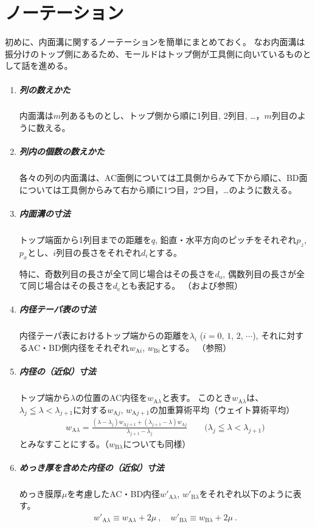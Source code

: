 \section{ノーテーション}
初めに、内面溝に関するノーテーションを簡単にまとめておく。
なお内面溝は振分けのトップ側にあるため、モールドはトップ側が工具側に向いているものとして話を進める。
\begin{tcolorbox}[title={内面溝に関するノーテーション}, fonttitle=\gtfamily\bfseries, breakable, enhanced jigsaw]
\begin{enumerate}
\item
\subparagraph{列の数えかた}
内面溝は$m$列あるものとし、トップ側から順に1列目, 2列目, …，$m$列目のように数える。

\item
\subparagraph{列内の個数の数えかた}
各々の列の内面溝は、AC面側については工具側からみて下から順に、BD面については工具側からみて右から順に1つ目，2つ目，…のように数える。

\item
\subparagraph{内面溝の寸法}
トップ端面から1列目までの距離を$q$, 鉛直・水平方向のピッチをそれぞれ$p_z$, $p_x$とし、$i$列目の長さをそれぞれ$d_i$とする。

特に、奇数列目の長さが全て同じ場合はその長さを$d_\mathrm o$, 偶数列目の長さが全て同じ場合はその長さを$d_\mathrm e$とも表記する。
（および参照）

\item
\subparagraph{内径テーパ表の寸法}
内径テーパ表におけるトップ端からの距離を$\lambda_i$ ($i = 0$, $1$, $2$, $\cdots$), それに対するAC・BD側内径をそれぞれ$w_{\mathrm Ai}$, $w_{\mathrm Bi}$とする。
（参照）

\item
\subparagraph{内径の（近似）寸法}
トップ端から$\lambda$の位置のAC内径を$w_{\mathrm A\lambda}$と表す。
このとき$w_{\mathrm A\lambda}$は、$\lambda_j \leqq \lambda < \lambda_{j+1}$に対する$w_{\mathrm Aj}$, $w_{\mathrm Aj+1}$の加重算術平均（ウェイト算術平均）
\begin{align*}
  w_{\mathrm A\lambda}
  = \frac{(\lambda-\lambda_j)w_{\mathrm Aj+1}+(\lambda_{j+1}-\lambda)w_{\mathrm Aj}}{\lambda_{j+1}-\lambda_j}
  \qquad
  \Big(\lambda_j \leqq \lambda < \lambda_{j+1}\Big)
\end{align*}
とみなすことにする。（$w_{\mathrm B\lambda}$についても同様）

\item
\subparagraph{めっき厚を含めた内径の（近似）寸法}
めっき膜厚$\mu$を考慮したAC・BD内径$w'_{\mathrm A\lambda}$, $w'_{\mathrm B\lambda}$をそれぞれ以下のように表す。
\begin{align*}
  w'_{\mathrm A\lambda} \equiv w_{\mathrm A\lambda}+2\mu~, \quad
  w'_{\mathrm B\lambda} \equiv w_{\mathrm B\lambda}+2\mu~.
\end{align*}
\end{enumerate}
\end{tcolorbox}\noindent

